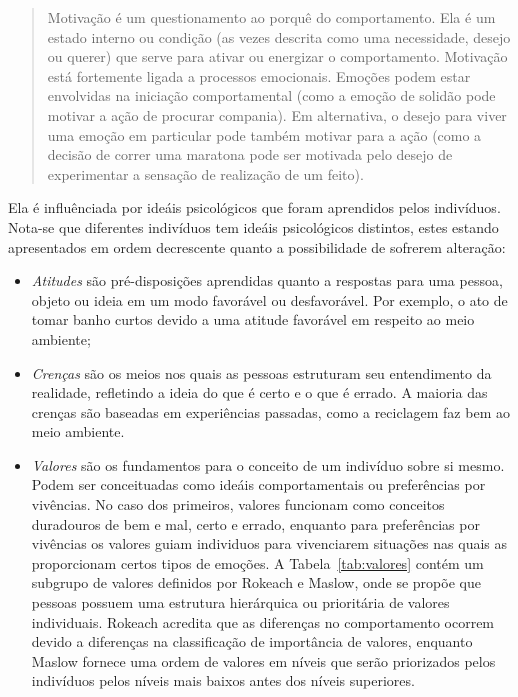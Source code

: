 \begin{quote}
Motivação é um questionamento ao porquê do comportamento. Ela é um estado
interno ou condição (as vezes descrita como uma necessidade, desejo ou querer)
que serve para ativar ou energizar o comportamento. Motivação está fortemente
ligada a processos emocionais. Emoções podem estar envolvidas na iniciação
comportamental (como a emoção de solidão pode motivar a ação de procurar
compania). Em alternativa, o desejo para viver uma emoção em particular pode
também motivar para a ação (como a decisão de correr uma maratona pode ser
motivada pelo desejo de experimentar a sensação de realização de um feito).
\end{quote}

Ela é influênciada por ideáis psicológicos que foram aprendidos pelos
indivíduos. Nota-se que diferentes indivíduos tem ideáis psicológicos distintos,
estes estando apresentados em ordem decrescente quanto a possibilidade de 
sofrerem alteração:

\begin{itemize}
\item \emph{Atitudes} são pré-disposições aprendidas quanto a respostas
para uma pessoa, objeto ou ideia em um modo favorável ou desfavorável. Por
exemplo, o ato de tomar banho curtos devido a uma atitude favorável em respeito
ao meio ambiente;
\item \emph{Crenças} são os meios nos quais as pessoas estruturam seu
entendimento da realidade, refletindo a ideia do que é certo e o que é errado. 
A maioria das crenças são baseadas em experiências passadas, como a reciclagem 
faz bem ao meio ambiente.
\item \emph{Valores} são os fundamentos para o conceito de um indivíduo sobre si
mesmo. Podem ser conceituadas como ideáis comportamentais ou preferências por
vivências. No caso dos primeiros, valores funcionam como conceitos duradouros de
bem e mal, certo e errado, enquanto para preferências por vivências os valores
guiam individuos para vivenciarem situações nas quais as proporcionam certos
tipos de emoções. A Tabela~\ref{tab:valores} contém um subgrupo de valores
definidos por Rokeach e Maslow, onde se propõe que pessoas possuem
uma estrutura hierárquica ou prioritária de valores individuais. Rokeach
acredita que as diferenças no comportamento ocorrem devido a diferenças na
classificação de importância de valores, enquanto Maslow fornece uma ordem de
valores em níveis que serão priorizados pelos indivíduos pelos níveis mais
baixos antes dos níveis superiores.
\end{itemize}

